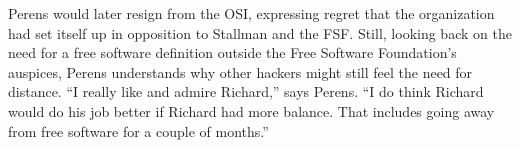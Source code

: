 





\ifdefined\eng
Perens would later resign from the OSI, expressing regret that the organization had set itself up in opposition to Stallman and the FSF. Still, looking back on the need for a free software definition outside the Free Software Foundation's auspices, Perens understands why other hackers might still feel the need for distance. ``I really like and admire Richard,'' says Perens. ``I do think Richard would do his job better if Richard had more balance. That includes going away from free software for a couple of months.''
\fi

